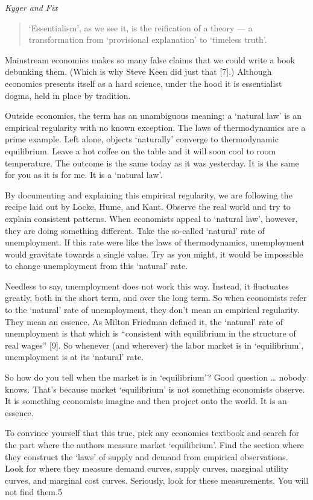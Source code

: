 \documentclass[
]{book}
\begin{document}
\emph{Kyger and Fix}

\begin{quote}
`Essentialism', as we see it, is the reification of a theory --- a transformation from `provisional explanation' to `timeless truth'.
\end{quote}

Mainstream economics makes so many false claims that we could write a book debunking them. (Which is why Steve Keen did just that {[}7{]}.) Although economics presents itself as a hard science, under the hood it is essentialist dogma, held in place by tradition.

Outside economics, the term has an unambiguous meaning: a `natural law' is an empirical regularity with no known exception. The laws of thermodynamics are a prime example. Left alone, objects `naturally' converge to thermodynamic equilibrium. Leave a hot coffee on the table and it will soon cool to room temperature. The outcome is the same today as it was yesterday. It is the same for you as it is for me. It is a `natural law'.

By documenting and explaining this empirical regularity, we are following the recipe laid out by Locke, Hume, and Kant. Observe the real world and try to explain consistent patterns. When economists appeal to `natural law', however, they are doing something different. Take the so-called `natural' rate of unemployment. If this rate were like the laws of thermodynamics, unemployment would gravitate towards a single value. Try as you might, it would be impossible to change unemployment from this `natural' rate.

Needless to say, unemployment does not work this way. Instead, it fluctuates greatly, both in the short term, and over the long term. So when economists refer to the `natural' rate of unemployment, they don't mean an empirical regularity. They mean an essence. As Milton Friedman defined it, the `natural' rate of unemployment is that which is ``consistent with equilibrium in the structure of real wages'' {[}9{]}. So whenever (and wherever) the labor market is in `equilibrium', unemployment is at its `natural' rate.

So how do you tell when the market is in `equilibrium'? Good question \ldots{} nobody knows. That's because market `equilibrium' is not something economists observe. It is something economists imagine and then project onto the world. It is an essence.

To convince yourself that this true, pick any economics textbook and search for the part where the authors measure market `equilibrium'. Find the section where they construct the `laws' of supply and demand from empirical observations. Look for where they measure demand curves, supply curves, marginal utility curves, and marginal cost curves. Seriously, look for these measurements. You will not find them.5
\end{document}
